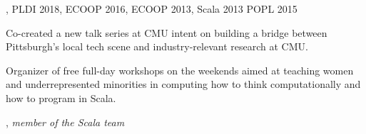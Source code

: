 \documentclass[9pt]{article}
\begin{document}
\newline{}, {PLDI 2018}, {ECOOP 2016}, {ECOOP 2013}, {Scala 2013}
\medskip
\newline{} {POPL 2015}
\medskip

\bigskip
{}


\newline\noindent Co-created a new talk series at CMU intent on building a bridge between
\newline\noindent Pittsburgh's local tech scene and industry-relevant research at CMU.

\medskip

\newline\noindent Organizer of free full-day workshops on the weekends aimed at teaching women
\newline\noindent and underrepresented minorities in computing how to think computationally and
\newline\noindent how to program in Scala.
\smallskip
\newline{}
\bigskip

\medskip
{}

\vspace{0.01in}
, {\em member of the Scala team} 
\end{document}
